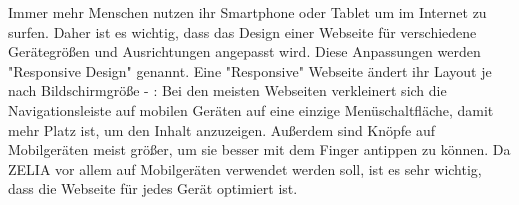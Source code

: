 
Immer mehr Menschen nutzen ihr Smartphone oder Tablet um im Internet zu surfen. 
Daher ist es wichtig, dass das Design einer Webseite für verschiedene Gerätegrößen und Ausrichtungen angepasst wird. 
Diese Anpassungen werden "Responsive Design" genannt. 
Eine "Responsive" Webseite ändert ihr Layout je nach Bildschirmgröße - \zb: 
Bei den meisten Webseiten verkleinert sich die Navigationsleiste auf mobilen Geräten auf eine einzige Menüschaltfläche, damit mehr Platz ist, um den Inhalt anzuzeigen. 
Außerdem sind Knöpfe auf Mobilgeräten meist größer, um sie besser mit dem Finger antippen zu können. 
Da ZELIA vor allem auf Mobilgeräten verwendet werden soll, ist es sehr wichtig, dass die Webseite für jedes Gerät optimiert ist. 

